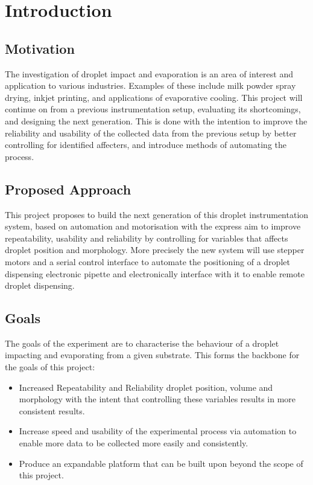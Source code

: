 \chapter{Introduction}\label{C:intro}

\section{Motivation}
The investigation of droplet impact and evaporation is an area of interest and application to various industries. Examples of these include milk powder spray drying, inkjet printing, and applications of evaporative cooling. This project will continue on from a previous instrumentation setup, evaluating its shortcomings, and designing the next generation. This is done with the intention to improve the reliability and usability of the collected data from the previous setup by better controlling for identified affecters, and introduce methods of automating the process.

\section{Proposed Approach}
This project proposes to build the next generation of this droplet instrumentation system, based on automation and motorisation with the express aim to improve repeatability, usability and reliability by controlling for variables that affects droplet position and morphology. More precisely the new system will use stepper motors and a serial control interface to automate the positioning of a droplet dispensing electronic pipette and electronically interface with it to enable remote droplet dispensing.     

\section{Goals}
The goals of the experiment are to characterise the behaviour of a droplet impacting and evaporating from a given substrate. This forms the backbone for the goals of this project:
\begin{itemize}
    \item Increased Repeatability and Reliability droplet position, volume and morphology with the intent that controlling these variables results in more consistent results. 
    \item Increase speed and usability of the experimental process via automation to enable more data to be collected more easily and consistently. 
    \item Produce an expandable platform that can be built upon beyond the scope of this project.
\end{itemize}

